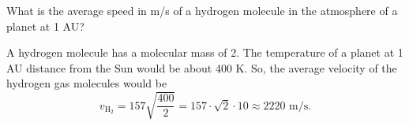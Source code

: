 \documentclass[../astro_4]{subfiles}
\begin{document}
\begin{problem}
What is the average speed in m/s of a hydrogen molecule in the atmosphere of a planet at 1 AU?
\end{problem}
A hydrogen molecule has a molecular mass of 2.
The temperature of a planet at 1 AU distance from the Sun would be about 400 K.
So, the average velocity of the hydrogen gas molecules would be \[
	v_{\text{H}_2} = 157\sqrt{\frac{400}{2}} = 157\cdot \sqrt{2}\cdot 10 \approx 2220 \text{ m/s}
	.\]
\end{document}
